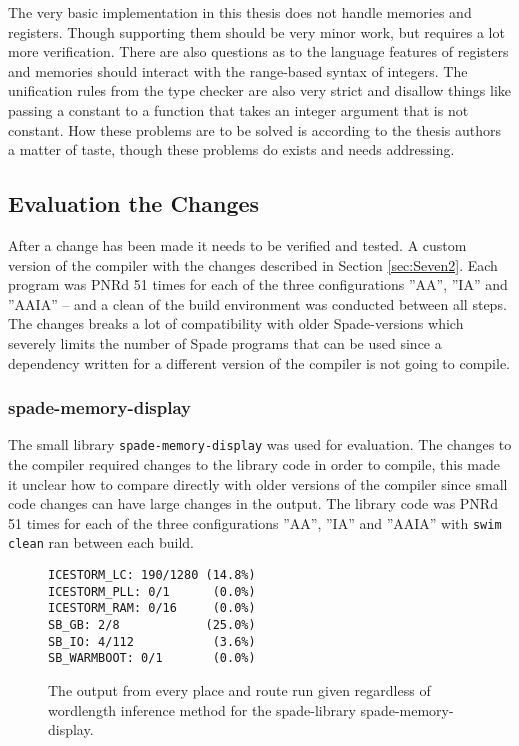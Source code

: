 The very basic implementation in this thesis does not handle memories and registers. Though supporting them should be very minor work, but requires a lot more verification. There are also questions as to the language features of registers and memories should interact with the range-based syntax of integers. The unification rules from the type checker are also very strict and disallow things like passing a constant to a function that takes an integer argument that is not constant. How these problems are to be solved is according to the thesis authors a matter of taste, though these problems do exists and needs addressing. 

\subsection{Evaluation the Changes}
After a change has been made it needs to be verified and tested. A custom version of the compiler with the changes described in Section \ref{sec:Seven2}. Each program was PNRd 51 times for each of the three configurations ''AA'', ''IA'' and ''AAIA'' -- and a clean of the build environment was conducted between all steps. The changes breaks a lot of compatibility with older Spade-versions which severely limits the number of Spade programs that can be used since a dependency written for a different version of the compiler is not going to compile.

\subsubsection{spade-memory-display}
The small library \verb+spade-memory-display+ was used for evaluation. The changes to the compiler required changes to the library code in order to compile, this made it unclear how to compare directly with older versions of the compiler since small code changes can have large changes in the output. The library code was PNRd 51 times for each of the three configurations ''AA'', ''IA'' and ''AAIA'' with \verb+swim clean+ ran between each build.
 
\begin{figure}
\begin{center}
\begin{verbatim}
ICESTORM_LC: 190/1280 (14.8%)
ICESTORM_PLL: 0/1      (0.0%)
ICESTORM_RAM: 0/16     (0.0%)
SB_GB: 2/8            (25.0%)
SB_IO: 4/112           (3.6%)
SB_WARMBOOT: 0/1       (0.0%)
\end{verbatim}
\end{center}

  \caption{The output from every place and route run given regardless of wordlength inference method for the spade-library spade-memory-display.}
  \label{fig:SMDoutput}
\end{figure}

